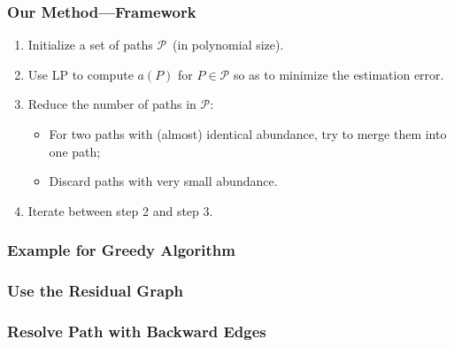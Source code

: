 \frame
{
	\frametitle{Our Method---Framework}
	\begin{enumerate}
	\item Initialize a set of paths $\mathcal{P}$~(in polynomial size).
	\vspace{0.2cm}
	\item Use LP to compute $a(P)$ for $P\in\mathcal{P}$ so as to minimize the estimation error.
	\vspace{0.2cm}
	\item Reduce the number of paths in $\mathcal{P}$:
		\begin{itemize}
		\vspace{0.1cm}
		\item For two paths with (almost) identical abundance, try to merge them into one path;
		\vspace{0.1cm}
		\item Discard paths with very small abundance.
		\end{itemize}
	\vspace{0.2cm}
	\item Iterate between step 2 and step 3.
	\end{enumerate}
}

\frame
{
	\frametitle{Example for Greedy Algorithm}

	\vspace{0.2cm}
	
	\vspace{0.8cm}

	\vspace{1.5cm}
	
	\vspace{0.8cm}
}

\frame
{
	\frametitle{Use the Residual Graph}

	\vspace{-3.4cm}
	
}

\frame
{
	\frametitle{Resolve Path with Backward Edges}

	\vspace{0.2cm}
	
	\vspace{4.3cm}
}

